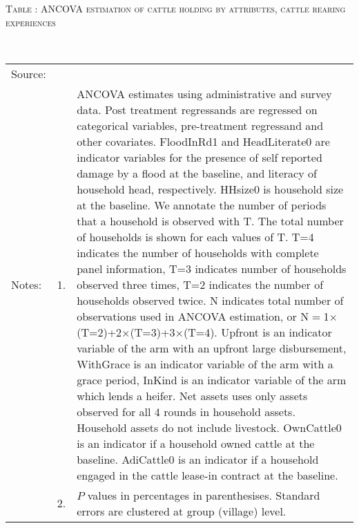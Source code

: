 \vspace{-1cm}\hspace{-1cm}\begin{minipage}[t]{14cm}
\hfil\textsc{\normalsize Table \thetable: ANCOVA estimation of cattle holding by attributes, cattle rearing experiences\label{tab ANCOVA NumCows Experience attributes}}\\
\setlength{\tabcolsep}{1pt}
\setlength{\baselineskip}{8pt}
\renewcommand{\arraystretch}{.52}
\hfil{}\\
\renewcommand{\arraystretch}{.8}
\setlength{\tabcolsep}{1pt}
\begin{tabular}{>{\hfill\scriptsize}p{1cm}<{}>{\hfill\scriptsize}p{.25cm}<{}>{\scriptsize}p{12cm}<{\hfill}}
Source:& \multicolumn{2}{l}{\scriptsize Estimated with GUK administrative and survey data.}\\
Notes: & 1. & ANCOVA estimates using administrative and survey data. Post treatment regressands are regressed on categorical variables, pre-treatment regressand and other covariates. \textsf{FloodInRd1} and \textsf{HeadLiterate0} are indicator variables for the presence of self reported damage by a flood at the baseline, and literacy of household head, respectively. \textsf{HHsize0} is household size at the baseline. We annotate the number of periods that a household is observed with \textsf{T}. The total number of households is shown for each values of \textsf{T}. \textsf{T=4} indicates the number of households with complete panel information, \textsf{T=3} indicates number of households observed three times, \textsf{T=2} indicates the number of households observed twice. \textsf{N} indicates total number of observations used in ANCOVA estimation, or \textsf{N$=$1$\times$(T=2)+2$\times$(T=3)+3$\times$(T=4)}.  \textsf{Upfront} is an indicator variable of the arm with an upfront large disbursement, \textsf{WithGrace} is an indicator variable of the arm with a grace period, \textsf{InKind} is an indicator variable of the arm which lends a heifer. Net assets uses only assets observed for all 4 rounds in household assets. Household assets do not include livestock. \textsf{OwnCattle0} is an indicator if a household owned cattle at the baseline. \textsf{AdiCattle0} is an indicator if a household engaged in the cattle lease-in contract at the baseline.  \\
& 2. & $P$ values in percentages in parenthesises. Standard errors are clustered at group (village) level.
\end{tabular}
\end{minipage}

